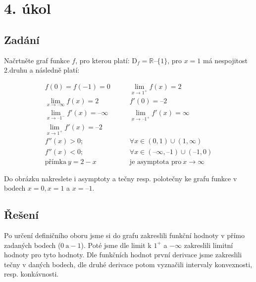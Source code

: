 \section{4. úkol}
\subsection{Zadání}
Načrtněte graf funkce $f$,
pro kterou platí: $\text{D}_{f} = \mathbb{R} – \{1\}$, pro $x = 1$ má nespojitost 2.druhu a následně platí:

\begin{align*}
f(0) = f(-1) = 0&\qquad \lim_{x\rightarrow 1^{+}} f(x) = 2\\
\lim_{x\rightarrow –\infty} f(x) = 2&\qquad f'(0) = –2\\
\lim_{x\rightarrow –1^{-}} f'(x) = – \infty&\qquad \lim_{x\rightarrow –1^{+}} f'(x) = \infty\\
\lim_{x\rightarrow 1^{+}} f'(x) = – 2&\\
f''(x) > 0;&\qquad\forall x \in (0, 1) \cup (1, \infty)\\
f''(x) < 0;&\qquad\forall x \in (–\infty, –1) \cup (–1,0)\\
\text{přímka}\ y = 2 - x &\qquad\text{je asymptota pro}\ x\rightarrow \infty
\end{align*}

Do obrázku nakreslete i asymptoty a tečny resp. polotečny ke grafu funkce v bodech $x = 0, x = 1$ a $x = –1$.

\subsection{Řešení}
Po určení definičního oboru jsme si do grafu zakreslili funkční hodnoty v přímo zadaných bodech ($0\ \text{a} -1$). Poté jsme dle limit k $1^+$ a $-\infty$ zakreslili limitní hodnoty pro tyto hodnoty. Dle funkčních hodnot první derivace jsme zakreslili tečny v daných bodech, dle druhé derivace potom vyznačili intervaly konvexnosti, resp. konkávnosti.

\begin{figure}[H]
		\centering
		 
\end{figure}
